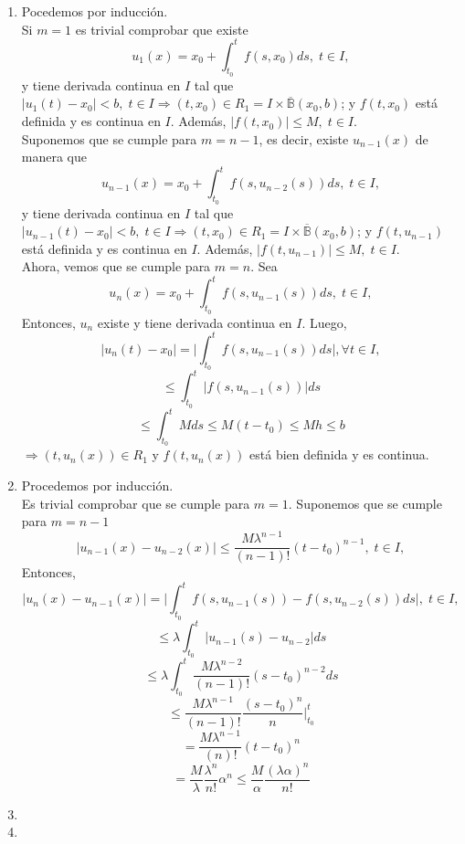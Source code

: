 \begin{dem}
  \begin{enumerate}[label=(\roman*)]
    \item Pocedemos por inducción. \\ 

      Si $m=1$ es trivial comprobar que existe
      \[
        u_{1}(x) = x_{0} + \int_{t_{0}}^{t} f(s, x_{0}) ds, \; t \in I,
      \]
      y tiene derivada continua en $I$ tal que $| u_{1}(t) - x_{0} | < b, \; t \in I \Rightarrow (t, x_{0}) \in R_{1} = I \times \overline{\mathbb{B}}(x_{0}, b)$; y $f(t, x_{0})$ está definida y es continua en $I$. Además, $| f(t, x_{0}) | \leq M, \; t \in I$. \\
      
      Suponemos que se cumple para $m=n-1$, es decir, existe $u_{n-1}(x)$ de manera que 
      \[
        u_{n-1}(x) = x_{0} + \int_{t_{0}}^{t} f(s, u_{n-2}(s)) ds, \; t \in I,
      \]
      y tiene derivada continua en $I$ tal que $| u_{n-1}(t) - x_{0} | < b, \; t \in I \Rightarrow (t, x_{0}) \in R_{1} = I \times \overline{\mathbb{B}}(x_{0}, b)$; y $f(t, u_{n-1})$ está definida y es continua en $I$. Además, $| f(t, u_{n-1}) | \leq M, \; t \in I$. \\

      Ahora, vemos que se cumple para $m=n$. Sea
      \[ 
        u_{n}(x) = x_{0} + \int_{t_{0}}^{t} f(s, u_{n-1}(s)) ds, \; t \in I,
      \] 
      Entonces, $u_{n}$ existe y tiene derivada continua en $I$. Luego,
      \[ 
        | u_{n}(t) - x_{0} | = \Big | \int_{t_{0}}^{t} f(s, u_{n-1}(s)) ds \Big |, \forall t \in I,
      \] 
      \[ 
        \leq \int_{t_{0}}^{t} | f(s, u_{n-1}(s)) | ds
      \] 
      \[ 
        \leq \int_{t_{0}}^{t} M ds \leq M(t - t_{0}) \leq Mh \leq b 
      \] 
      $\Rightarrow (t, u_{n}(x)) \in R_{1}$ y $f(t, u_{n}(x))$ está bien definida y es continua.
    \item Procedemos por inducción. \\

      Es trivial comprobar que se cumple para $m=1$. Suponemos que se cumple para $m=n-1$
      \[ 
        | u_{n-1}(x) - u_{n-2}(x) | \leq \frac{M \lambda^{n-1}}{(n-1)!}(t - t_{0})^{n-1}, \; t \in I,
      \] 
      Entonces, 
      \[ 
        | u_{n}(x) - u_{n-1}(x) | =  \Big | \int_{t_{0}}^{t} f(s, u_{n-1}(s)) - f(s, u_{n-2}(s)) ds \Big |, \; t \in I,
      \] 
      \[ 
        \leq \lambda \int_{t_{0}}^{t} | u_{n-1}(s) - u_{n-2} | ds
      \] 
      \[ 
        \leq \lambda \int_{t_{0}}^{t} \frac{M \lambda^{n-2}}{(n-1)!}(s - t_{0})^{n-2} ds 
      \] 
      \[ 
        \leq  \frac{M \lambda^{n-1}}{(n-1)!} \frac{(s-t_{0})^{n}}{n} \Bigg |_{t_{0}}^{t}
      \] 
      \[ 
        = \frac{M \lambda^{n-1}}{(n)!} (t - t_{0})^n 
      \] 
      \[ 
        = \frac{M}{\lambda} \frac{\lambda^n}{n!} \alpha^n \leq \frac{M}{\alpha} \frac{(\lambda \alpha)^n}{n!}
      \] 
    \item 
    \item 
  \end{enumerate}
\end{dem}
